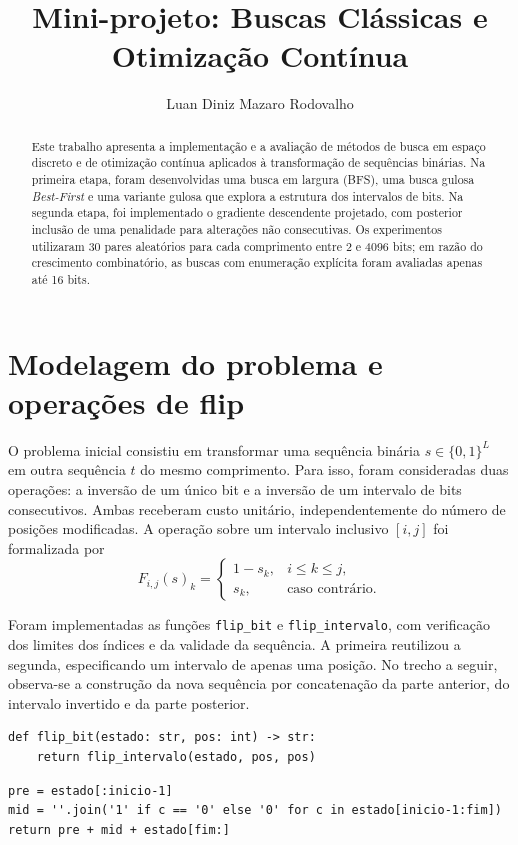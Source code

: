 \documentclass[10pt,a4paper,twocolumn]{article}
\title{Mini-projeto: Buscas Clássicas e Otimização Contínua}
\author{Luan Diniz Mazaro Rodovalho}
\date{}
\begin{document}
\maketitle
\vspace{-2.7em}

\begin{abstract}\noindent
Este trabalho apresenta a implementação e a avaliação de métodos de busca em espaço discreto e de otimização contínua aplicados à transformação de sequências binárias. Na primeira etapa, foram desenvolvidas uma busca em largura (BFS), uma busca gulosa \textit{Best-First} e uma variante gulosa que explora a estrutura dos intervalos de bits. Na segunda etapa, foi implementado o gradiente descendente projetado, com posterior inclusão de uma penalidade para alterações não consecutivas. Os experimentos utilizaram 30 pares aleatórios para cada comprimento entre 2 e 4096 bits; em razão do crescimento combinatório, as buscas com enumeração explícita foram avaliadas apenas até 16 bits.
\end{abstract}
\vspace{-.7em}

\section{Modelagem do problema e operações de flip}
O problema inicial consistiu em transformar uma sequência binária $s\in\{0,1\}^L$ em outra sequência $t$ do mesmo comprimento. Para isso, foram consideradas duas operações: a inversão de um único bit e a inversão de um intervalo de bits consecutivos. Ambas receberam custo unitário, independentemente do número de posições modificadas. A operação sobre um intervalo inclusivo $[i,j]$ foi formalizada por
\begin{equation}
F_{i,j}(s)_k=\begin{cases}1-s_k,&i\leq k\leq j,\\s_k,&\text{caso contrário.}\end{cases}
\end{equation}

Foram implementadas as funções \texttt{flip\_bit} e \texttt{flip\_intervalo}, com verificação dos limites dos índices e da validade da sequência. A primeira reutilizou a segunda, especificando um intervalo de apenas uma posição. No trecho a seguir, observa-se a construção da nova sequência por concatenação da parte anterior, do intervalo invertido e da parte posterior.
\begin{lstlisting}
def flip_bit(estado: str, pos: int) -> str:
    return flip_intervalo(estado, pos, pos)
\end{lstlisting}
\begin{lstlisting}
pre = estado[:inicio-1]
mid = ''.join('1' if c == '0' else '0' for c in estado[inicio-1:fim])
return pre + mid + estado[fim:]
\end{lstlisting}
\end{document}

